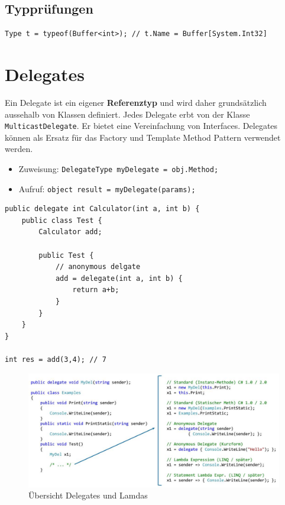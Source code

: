 \subsection{Typprüfungen}
\begin{lstlisting}
Type t = typeof(Buffer<int>); // t.Name = Buffer[System.Int32]
\end{lstlisting}


\section{Delegates}
Ein Delegate ist ein eigener \textbf{Referenztyp} und wird daher grundsätzlich aussehalb von Klassen definiert. Jedes Delegate erbt von der Klasse \lstinline|MulticastDelegate|. Er bietet eine Vereinfachung von Interfaces. Delegates können als Ersatz für das Factory und Template Method Pattern verwendet werden. 
\begin{itemize}
	\item Zuweisung: \lstinline|DelegateType myDelegate = obj.Method;|
	\item Aufruf: \lstinline|object result = myDelegate(params);|
\end{itemize}
\begin{lstlisting}
public delegate int Calculator(int a, int b) {
	public class Test {
		Calculator add;
		
		public Test {
			// anonymous delgate
			add = delegate(int a, int b) {
				return a+b;
			}
		}
	}
}

int res = add(3,4); // 7
\end{lstlisting}

\begin{figure}[h]
	\centering
	\includegraphics[width=\linewidth]{images/delegate_lamda_overview}
	\caption{Übersicht Delegates und Lamdas}
	\label{fig:delegatelamdaoverview}
\end{figure}

\clearpage

